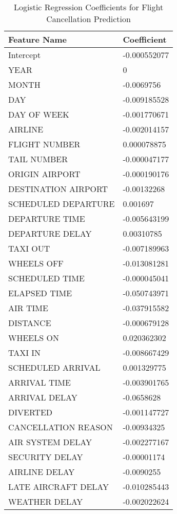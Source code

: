 \documentclass[conference]{IEEEtran}
\begin{document}
\begin{table}[!ht]
    \centering
    \caption{Logistic Regression Coefficients for Flight Cancellation Prediction}
    \label{tab:logistic_coefficients} %
    \begin{tabular}{|l|l|}
    \hline
        Feature Name & Coefficient \\ \hline
        Intercept & -0.000552077 \\ \hline
        YEAR & 0 \\ \hline
        MONTH & -0.0069756 \\ \hline
        DAY & -0.009185528 \\ \hline
        DAY OF WEEK & -0.001770671 \\ \hline
        AIRLINE & -0.002014157 \\ \hline
        FLIGHT NUMBER & 0.000078875 \\ \hline
        TAIL NUMBER & -0.000047177 \\ \hline
        ORIGIN AIRPORT & -0.000190176 \\ \hline
        DESTINATION AIRPORT & -0.00132268 \\ \hline
        SCHEDULED DEPARTURE & 0.001697 \\ \hline
        DEPARTURE TIME & -0.005643199 \\ \hline
        DEPARTURE DELAY & 0.00310785 \\ \hline
        TAXI OUT & -0.007189963 \\ \hline
        WHEELS OFF & -0.013081281 \\ \hline
        SCHEDULED TIME & -0.000045041 \\ \hline
        ELAPSED TIME & -0.050743971 \\ \hline
        AIR TIME & -0.037915582 \\ \hline
        DISTANCE & -0.000679128 \\ \hline
        WHEELS ON & 0.020362302 \\ \hline
        TAXI IN & -0.008667429 \\ \hline
        SCHEDULED ARRIVAL & 0.001329775 \\ \hline
        ARRIVAL TIME & -0.003901765 \\ \hline
        ARRIVAL DELAY & -0.0658628 \\ \hline
        DIVERTED & -0.001147727 \\ \hline
        CANCELLATION REASON & -0.00934325 \\ \hline
        AIR SYSTEM DELAY & -0.002277167 \\ \hline
        SECURITY DELAY & -0.00001174 \\ \hline
        AIRLINE DELAY & -0.0090255 \\ \hline
        LATE AIRCRAFT DELAY & -0.010285443 \\ \hline
        WEATHER DELAY & -0.002022624 \\ \hline
    \end{tabular}
\end{table}
\end{document}
